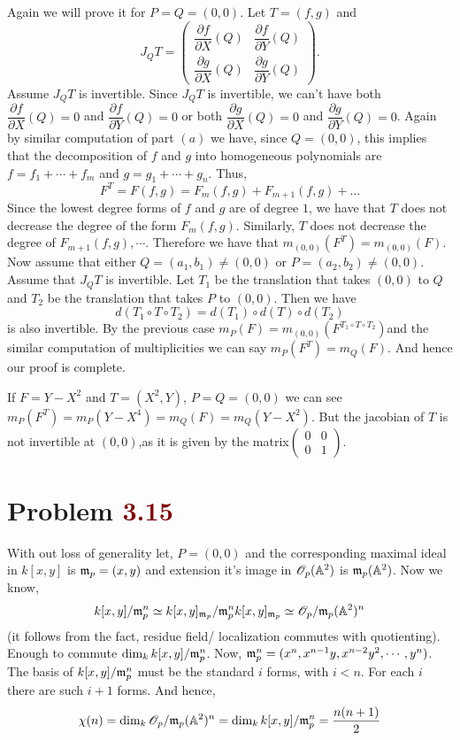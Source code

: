 \documentclass[12pt]{article}
\begin{document}
 \noindent {} Again we will prove it for $P=Q=(0,0)$. Let $T = (f,g)$ and 
 $$
 J_Q T = \begin{pmatrix} \dfrac{\partial f}{\partial X}(Q) & \dfrac{\partial f}{\partial Y}(Q) \\ \dfrac{\partial g}{\partial X}(Q) & \dfrac{\partial g}{\partial Y}(Q) \end{pmatrix}.
 $$
 Assume $J_Q T$ is invertible. Since $J_Q T$ is invertible, we can't have both $\dfrac{\partial f}{\partial X}(Q) = 0$ and $\dfrac{\partial f}{\partial Y}(Q) = 0$ or both $\dfrac{\partial g}{\partial X}(Q) = 0$ and $\dfrac{\partial g}{\partial Y}(Q) = 0$. Again by similar computation of part $(a)$ we have, since $Q = (0,0)$, this implies that the decomposition of $f$ and $g$ into homogeneous polynomials are $f = f_1 + \cdots + f_m$ 
and $g = g_1 + \cdots + g_n$. Thus,
 $$
 F^T = F(f,g) = F_m(f,g) + F_{m+1}(f,g) + \ldots
 $$
 Since the lowest degree forms of $f$ and $g$ are of degree $1$, we have that $T$ does not decrease the degree of the form $F_m(f,g)$. Similarly, $T$ does not decrease the degree of $F_{m+1}(f,g), \cdots$. Therefore we have that $m_{(0,0)}(F^T) = m_{(0,0)}(F)$. Now assume that either $Q = (a_1,b_1) \neq (0,0)$ or $P = (a_2,b_2) \neq (0,0)$. Assume that $J_Q T$ is invertible. Let $T_1$  be the translation that takes $(0,0)$ to $Q$ and $T_2$ be the translation that takes $P$ to $(0,0)$. Then we have
 $$
  d(T_1\circ T\circ T_2) = d(T_1)\circ d(T) \circ d(T_2)
 $$
is also invertible. By the previous case $m_P(F) = m_{(0,0)}(F^{T_1\circ T\circ T_2})$and the similar computation of multiplicities we can say $m_P(F^T)=m_Q(F)$. And hence our proof is complete. 

\vspace*{0.2cm}

\noindent {} If $F= Y-X^2$ and $T =(X^2,Y)$, $P=Q =(0,0)$ we can see $m_P(F^T)=m_P(Y-X^4)=m_Q(F)=m_Q(Y-X^2)$. But the jacobian of $T$ is not invertible at $(0,0)$,as it is given by the matrix$\begin{pmatrix}
    0 & 0\\
    0 & 1
\end{pmatrix}$.\Qed

\section{Problem \textcolor{maroon}{3.15}} %

 With out loss of generality let, $P=(0,0)$ and the corresponding maximal ideal in $k[x,y]$ is $\mathfrak{m}_p =(x,y)$ and extension it's image in $\mathscr{O}_p(\mathbb{A}^2)$ is $\mathfrak{m}_p(\mathbb{A}^2)$. Now we know, $$k[x,y]/\mathfrak{m}_p^n \simeq k[x,y]_{\mathfrak{m}_p}/ \mathfrak{m}_p^n k[x,y]_{\mathfrak{m}_p} \simeq \mathscr{O}_p/\mathfrak{m}_p(\mathbb{A}^2)^n$$ (it follows from the fact, residue field/ localization commutes with quotienting). Enough to commute $\dim_k k[x,y]/\mathfrak{m}_p^n$. Now, $\mathfrak{m}_p^n = (x^n,x^{n-1}y,x^{n-2}y^2,\cdots,y^n)$. The basis of $k[x,y]/\mathfrak{m}_p^n$ must be the standard $i$ forms, with $i<n$. For each $i$ there are such $i+1$ forms. And hence, $$\chi(n) = \dim_k \mathscr{O}_p/\mathfrak{m}_p(\mathbb{A}^2)^n = \dim_k k[x,y]/\mathfrak{m}_p^n = \frac{n(n+1)}{2}$$
\end{document}

